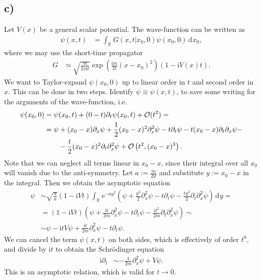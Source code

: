 \documentclass[english, parskip=full]{scrartcl}
\newcommand{\intr}{}
\newcommand{\kla}{}
\renewcommand{\i}{\text{i}}
\newcommand{\e}{\text{e}}
\begin{document}
\subsection*{c)}
Let $V(x)$ be a general scalar potential.
The wave-function can be written as
\begin{align}
\psi(x,t) &= \intr\int_{\mathbb{R}^{ }} G(x,t|x_0,0)\psi(x_0,0) \, \mathrm{d}^{ }x_0,
\end{align}
where we may use the short-time propagator
\begin{align}
G &\simeq \sqrt{\frac{m}{2\pi\i t}} \exp\kla\left( \frac{\i m}{2t}(x-x_0)^2 \right)\kla\left( 1 - \i V(x)t \right).
\end{align}
We want to Taylor-expand $\psi(x_0,0)$ up to linear order in $t$ and second order in $x$.
This can be done in two steps.
Identify $\psi\equiv\psi(x,t)$, to save some writing for the arguments of the wave-function, i.e.
\begin{align}
\psi(x_0,0) &= \psi(x_0,t) + (0 - t)\partial_t\psi(x_0,t) + \mathcal{O}(t^2) = \\
&= \psi + (x_0 - x)\partial_x\psi  + \frac{1}{2} (x_0 - x)^2\partial_x^2\psi - t\partial_t\psi - t (x_0 - x)\partial_t\partial_x\psi - \\
&\hspace{0.7cm} - \frac{t}{2}(x_0-x)^2\partial_t\partial_x^2\psi  + \mathcal{O}\kla\left( t^2,(x_0-x)^3 \right).
\end{align}
Note that we can neglect all terms linear in $x_0-x$, since their integral over all $x_0$ will vanish due to the anti-symmetry.
Let $a := \frac{m}{2\i t}$ and substitute $y := x_0 - x$ in the integral.
Then we obtain the asymptotic equation
\begin{align}
\psi&\sim \sqrt{\frac{\pi}{a}}\kla\left( 1 - \i Vt \right)\intr\int_{\mathbb{R}^{ }} \e^{-ay^2}\kla\left( \psi + \frac{y^2}{2}\partial_x^2\psi - t\partial_t\psi - \frac{ty^2}{2}\partial_t\partial_x^2\psi \right) \, \mathrm{d}^{ }y = \\
&= \kla\left( 1 - \i Vt \right)\kla\left( \psi + \frac{\i t}{2m}\partial_x^2\psi - t\partial_t\psi - \frac{\i t^2}{2m}\partial_t\partial_x^2\psi \right) \sim \\
&\sim \psi - \i tV\psi + \frac{\i t}{2m}\partial_x^2\psi - t\partial_t\psi.
\end{align}
We can cancel the term $\psi(x,t)$ on both sides, which is effectively of order $t^0$, and divide by $\i t$ to obtain the Schrödinger equation
\begin{align}
\i\partial_t&\sim -\frac{1}{2m}\partial_x^2\psi + V\psi.
\end{align}
This is an asymptotic relation, which is valid for $t\rightarrow 0$.

\end{document}
